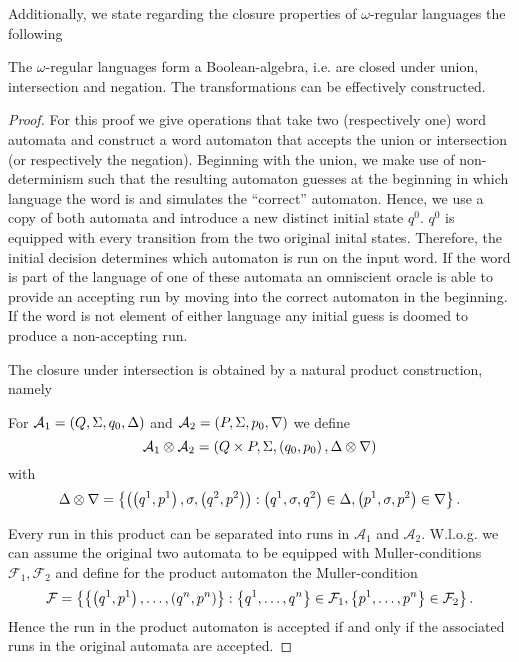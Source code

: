Additionally, we state regarding the closure properties of $\omega$-regular
languages the following
\begin{theorem}
  \cite[Consequence from Theorem 1.5 and Theorem 1.24]{AutoLogInfGames}
  The $\omega$-regular languages form a Boolean-algebra, i.e. are closed under
  union, intersection and negation. The transformations can be effectively
  constructed.
  \label{thm:omegaregboolean}
\end{theorem}
\begin{proof}
  For this proof we give operations that take two (respectively one) word
  automata and construct a word automaton that accepts the union or
  intersection (or respectively the negation). Beginning with the union, we
  make use of non-determinism such that the resulting automaton guesses at the
  beginning in which language the word is and simulates the \enquote{correct}
  automaton. Hence, we use a copy of both automata and introduce a new distinct
  initial state $q^{0}$. $q^{0}$ is equipped with every transition from the two
  original inital states. Therefore, the initial decision determines which
  automaton is run on the input word. If the word is part of the language of
  one of these automata an omniscient oracle is able to provide an accepting
  run by moving into the correct automaton in the beginning. If the word is
  not element of either language any initial guess is doomed to produce a
  non-accepting run.

  The closure under intersection is obtained by a natural product construction,
  namely
  \begin{definition}
    For $\mathcal{A}_{1} = \left(Q, \Sigma, q_{0}, \Delta\right)$ and
    $\mathcal{A}_{2} = \left(P, \Sigma, p_{0}, \nabla\right)$ we define
    \begin{equation*}
      \mathcal{A}_{1}\otimes\mathcal{A}_{2} = \left(Q\times P, \Sigma, 
      \left(q_{0}, p_{0}\right), \Delta\otimes\nabla\right)
    \end{equation*}
    with
    \begin{equation*}
      \Delta\otimes\nabla = 
      \left\{\left(\left(q^{1}, p^{1}\right), \sigma, 
      \left(q^{2}, p^{2}\right)\right): \left(q^{1},\sigma, q^{2}\right)\in\Delta, 
      \left(p^{1},\sigma, p^{2}\right)\in\nabla\right\}.
    \end{equation*}
  \end{definition}
  Every run in this product can be separated into runs in $\mathcal{A}_{1}$ and
  $\mathcal{A}_{2}$. W.l.o.g. we can assume the original two automata to be
  equipped with Muller-conditions $\mathcal{F}_{1},\mathcal{F}_{2}$ and define
  for the product automaton the Muller-condition 
  \begin{equation*}
    \mathcal{F} = \left\{\left\{\left(q^{1}, p^{1}\right),\dots,\left(q^{n}, p^{n}\right)\right\}:
    \left\{q^{1},\dots,q^{n}\right\}\in\mathcal{F}_{1},
    \left\{p^{1},\dots,p^{n}\right\}\in\mathcal{F}_{2}\right\}.
  \end{equation*}
  Hence the run in the product automaton is accepted if and only if the
  associated runs in the original automata are accepted.


\end{proof}

